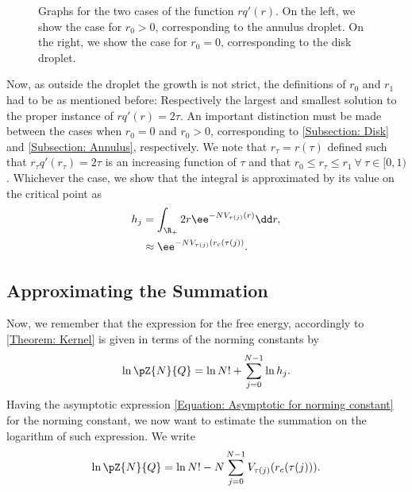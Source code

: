 \begin{figure}[h!]
\begin{subfigure}[t]{0.45\textwidth}
	\end{subfigure}
	\caption{Graphs for the two cases of the function $rq'(r)$. On the left, we show the case for $r_0 > 0$, corresponding to the annulus droplet. On the right, we show the case for $r_0 = 0$, corresponding to the disk droplet.}
\end{figure}

Now, as outside the droplet the growth is not strict, the definitions of $r_0$ and $r_1$ had to be as mentioned before: Respectively the largest and smallest solution to the proper instance of $rq'(r) = 2\tau$. An important distinction must be made between the cases when $r_0 = 0$ and $r_0 > 0$, corresponding to \autoref{Subsection: Disk} and \autoref{Subsection: Annulus}, respectively.  We note that $r_\tau = r(\tau)$ defined such that $r_\tau q'(r_\tau) = 2 \tau$ is an increasing function of $\tau$ and that $r_0 \leq r_\tau \leq r_1 \ \forall \ \tau \in [0,1)$. Whichever the case, we show that the integral is approximated by its value on the critical point as
\begin{align}
	h_j & = \int_{\R_+} 2r \ee^{-N V_{\tau(j)}(r)} \dd r, \\
	&  \approx \ee^{-N V_{\tau(j)}(r_c(\tau(j))}.
	\label{Equation: Asymptotic for norming constant}
\end{align}

\subsection{Approximating the Summation}

Now, we remember that the expression for the free energy, accordingly to \autoref{Theorem: Kernel} is given in terms of the norming constants by
\begin{equation}
	\ln \pZ{N}{Q} = \ln{N!} + \sum_{j=0}^{N-1} \ln{h_j}.
\end{equation}
Having the asymptotic expression \eqref{Equation: Asymptotic for norming constant} for the norming constant, we now want to estimate the summation on the logarithm of such expression. We write
\begin{equation}
	\ln \pZ{N}{Q} = \ln{N!} - N \sum_{j=0}^{N-1} V_{\tau(j)}(r_c(\tau(j))).
\end{equation}

